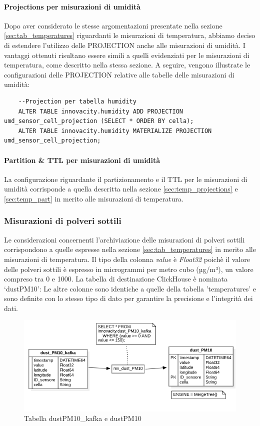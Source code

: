 \paragraph{Projections per misurazioni di umidità} 
Dopo aver considerato le stesse argomentazioni presentate nella sezione \ref{sec:tab_temperatures} riguardanti le misurazioni di temperatura, abbiamo deciso di estendere l'utilizzo delle PROJECTION anche alle misurazioni di umidità. I vantaggi ottenuti risultano essere simili a quelli evidenziati per le misurazioni di temperatura, come descritto nella stessa sezione. A seguire, vengono illustrate le configurazioni delle PROJECTION relative alle tabelle delle misurazioni di umidità:

\begin{lstlisting}
    --Projection per tabella humidity
    ALTER TABLE innovacity.humidity ADD PROJECTION umd_sensor_cell_projection (SELECT * ORDER BY cella);
    ALTER TABLE innovacity.humidity MATERIALIZE PROJECTION umd_sensor_cell_projection;
\end{lstlisting}

\paragraph{Partition \& TTL per misurazioni di umidità}
La configurazione riguardante il partizionamento e il TTL per le misurazioni di umidità corrisponde a quella descritta nella sezione \ref{sec:temp_projections} e \ref{sec:temp_part} in merito alle misurazioni di temperatura.

\subsubsection{Misurazioni di polveri sottili}
Le considerazioni concernenti l'archiviazione delle misurazioni di polveri sottili corrispondono a quelle espresse nella sezione \ref{sec:tab_temperatures} in merito alle misurazioni di temperatura.
Il tipo della colonna \textit{value} è \textit{Float32} poichè il valore delle polveri sottili è espresso in microgrammi per metro cubo (µg/m³), un valore compreso tra 0 e 1000. La tabella di destinazione ClickHouse è nominata ‘dustPM10’:
Le altre colonne sono identiche a quelle della tabella 'temperatures' e sono definite con lo stesso tipo di dato per garantire la precisione e l'integrità dei dati.
\begin{figure}[H]
    \centering
    \includegraphics[width=1\textwidth]{../Images/SpecificaTecnica/dust_PM10.png}
    \caption{Tabella dustPM10\_kafka e dustPM10}
    \label{fig:dust_table}
  \end{figure}

